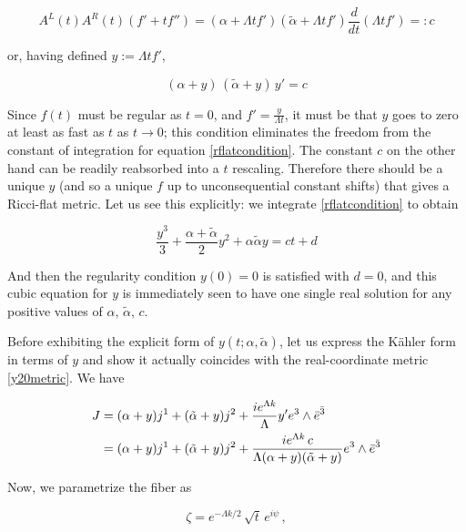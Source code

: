 \begin{equation}
	A^L(t)A^R(t)(f'+tf'') = (\alpha + \Lambda t f')(\tilde{\alpha} + \Lambda t f') \frac{d}{dt} (\Lambda t f') =: c \label{rflatcondition}
\end{equation}

or, having defined $y := \Lambda t f'$,

\begin{equation}
	(\alpha + y)\,(\tilde{\alpha} + y)\, y' = c
\end{equation}

Since $f(t)$ must be regular as $t=0$, and $f' = \frac{y}{\Lambda t}$, it must be that $y$ goes to zero at least as fast as $t$ as $t\rightarrow 0$; this condition eliminates the freedom from the constant of integration for equation \eqref{rflatcondition}. The constant $c$ on the other hand can be readily reabsorbed into a $t$ rescaling. Therefore there should be a unique $y$ (and so a unique $f$ up to unconsequential constant shifts) that gives a Ricci-flat metric. Let us see this explicitly: we integrate \eqref{rflatcondition} to obtain

\begin{equation}
	\frac{y^3}{3} + \frac{\alpha + \tilde{\alpha}}{2} y^2 + \alpha \tilde{\alpha} y = ct + d \label{rflatintegrated}
\end{equation}

And then the regularity condition $y(0)=0$ is satisfied with $d=0$, and this cubic equation for $y$ is immediately seen to have one single real solution for any positive values of $\alpha$, $\tilde\alpha$, $c$.

Before exhibiting the explicit form of $y(t;\alpha,\tilde\alpha)$, let us express the K\"ahler form in terms of $y$ and show it actually coincides with the real-coordinate metric \eqref{y20metric}. We have

\begin{align}
	\label{Jintermsofy}
	J & =  (\alpha + y) j^1 + (\tilde{\alpha} + y) j^2 + \frac{ie^{\Lambda k}}\Lambda y' e^3 \wedge \bar e^{\bar 3}\\
	  & =  (\alpha + y) j^1 + (\tilde{\alpha} + y) j^2 + \frac{ie^{\Lambda k} \,c}{\Lambda (\alpha + y)(\tilde{\alpha} + y)} e^3 \wedge \bar e^{\bar 3}
\end{align}

Now, we parametrize the fiber as 

\begin{equation}
	\zeta = e^{-\Lambda k/2}\, \sqrt{t} \,e^{i\psi}\,,
\end{equation}

